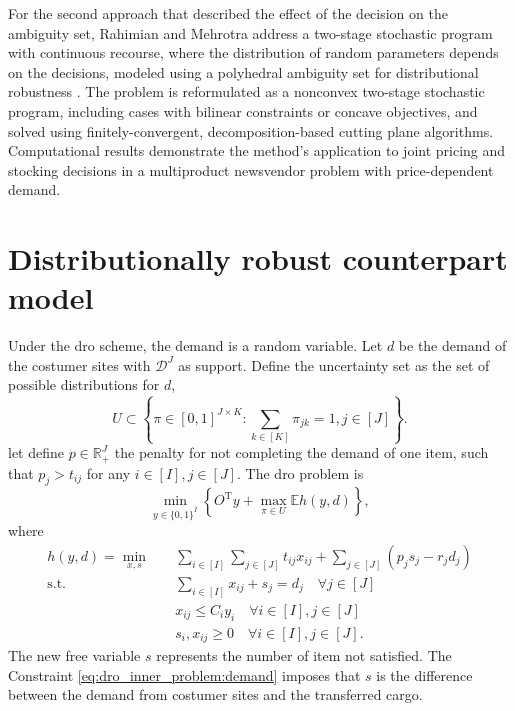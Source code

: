 \documentclass[12pt, letterpaper]{article}
\newcommand{\R}{\mathbb{R}}
\newcommand{\T}{\mathrm{T}}
\newcommand{\E}{\mathbb{E}}
\newcommand{\Dcal}{\mathcal{D}}
\begin{document}
	For the second approach that described the effect of the decision on the ambiguity set, Rahimian and Mehrotra address a two-stage stochastic program with continuous recourse, where the distribution of random parameters depends on the decisions, modeled using a polyhedral ambiguity set for distributional robustness \cite{rahimiandistributionally}. The problem is reformulated as a nonconvex two-stage stochastic program, including cases with bilinear constraints or concave objectives, and solved using finitely-convergent, decomposition-based cutting plane algorithms. Computational results demonstrate the method’s application to joint pricing and stocking decisions in a multiproduct newsvendor problem with price-dependent demand.

	\section{Distributionally robust counterpart model}
	Under the \gls{dro} scheme, the demand is a random variable. Let $d$ be the demand of the costumer sites with $\Dcal^J$ as support. Define the uncertainty set as the set of possible distributions for $d$,
	\begin{equation} \label{eq:def_uncertainty_set}
		U \subset \left\{\pi \in [0, 1]^{J \times K}: \sum_{k \in [K]} \pi_{jk} = 1, j \in [J]\right\}.
	\end{equation}
	let define $p \in \R_+^J$ the penalty for not completing the demand of one item, such that $p_j > t_{ij}$ for any $i \in [I], j \in [J]$. The \gls{dro} problem is
	\begin{equation}\label{eq:dro_outter_problem}
		\min_{y \in \{0, 1\}^I} \left\{O^\T y + \max_{\pi \in U} \E h(y, d)\right\},
	\end{equation}
	where
	\begin{subequations} \label{eq:dro_inner_problem}
		\begin{align}
			h(y, d) = \min_{x, s} &\quad \sum_{i \in [I]} \sum_{j \in [J]} t_{ij}x_{ij} + \sum_{j \in [J]} (p_j s_j - r_j d_j) \\
			\text{s.t.} &\quad \sum_{i \in [I]} x_{ij} + s_j = d_j \quad \forall j \in [J] \label{eq:dro_inner_problem:demand}\\
			&\quad x_{ij} \le C_i y_i \quad \forall i \in [I], j \in [J] \\
			&\quad s_i, x_{ij} \ge 0 \quad \forall i \in [I], j \in [J].
		\end{align}
	\end{subequations}
	The new free variable $s$ represents the number of item not satisfied. The Constraint \eqref{eq:dro_inner_problem:demand} imposes that $s$ is the difference between the demand from costumer sites and the transferred cargo.
	
\end{document}

